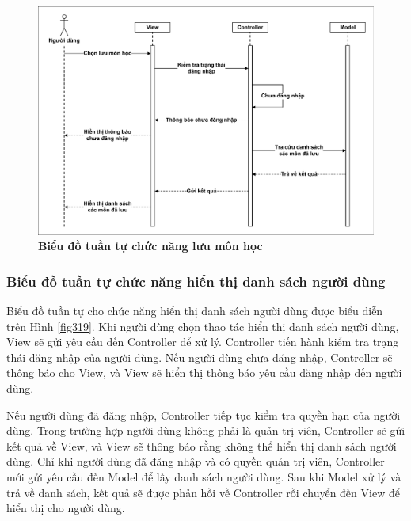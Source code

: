 \documentclass{article}
\begin{document}
	 \begin{figure}[!ht]
	 	\centering
	 	\includegraphics[trim= 10pt 10pt 10pt 10pt, clip, width=16cm]{sequence_fig318_1.pdf}
	 	\caption [Biểu đồ tuần tự chức năng lưu môn học]{\bfseries \fontsize{12pt}{0pt}\selectfont Biểu đồ tuần tự chức năng lưu môn học}
	 	\label{fig318}
	 \end{figure}
	 
	 \subsubsection{Biểu đồ tuần tự chức năng hiển thị danh sách người dùng}
	 
	 Biểu đồ tuần tự cho chức năng hiển thị danh sách người dùng được biểu diễn trên Hình \ref{fig319}. Khi người dùng chọn thao tác hiển thị danh sách người dùng, View sẽ gửi yêu cầu đến Controller để xử lý. Controller tiến hành kiểm tra trạng thái đăng nhập của người dùng. Nếu người dùng chưa đăng nhập, Controller sẽ thông báo cho View, và View sẽ hiển thị thông báo yêu cầu đăng nhập đến người dùng.
	 
	 Nếu người dùng đã đăng nhập, Controller tiếp tục kiểm tra quyền hạn của người dùng. Trong trường hợp người dùng không phải là quản trị viên, Controller sẽ gửi kết quả về View, và View sẽ thông báo rằng không thể hiển thị danh sách người dùng. Chỉ khi người dùng đã đăng nhập và có quyền quản trị viên, Controller mới gửi yêu cầu đến Model để lấy danh sách người dùng. Sau khi Model xử lý và trả về danh sách, kết quả sẽ được phản hồi về Controller rồi chuyển đến View để hiển thị cho người dùng.
	 
\end{document}
